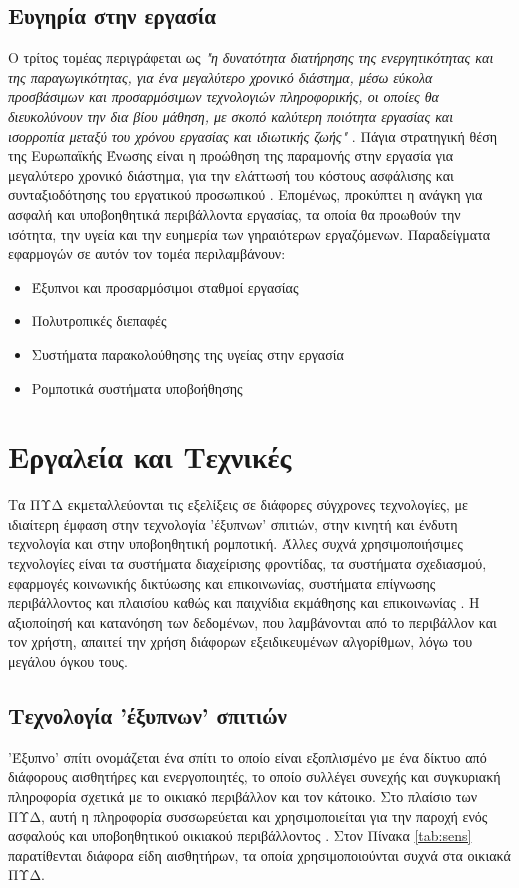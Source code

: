 \subsection{Ευγηρία στην εργασία}
Ο τρίτος τομέας περιγράφεται ως \textit{"η δυνατότητα διατήρησης της ενεργητικότητας και της παραγωγικότητας, για ένα μεγαλύτερο χρονικό διάστημα, μέσω εύκολα προσβάσιμων και προσαρμόσιμων τεχνολογιών πληροφορικής, οι οποίες θα διευκολύνουν την δια βίου μάθηση, με σκοπό καλύτερη ποιότητα εργασίας και ισορροπία μεταξύ του χρόνου εργασίας και ιδιωτικής ζωής"} \cite{broek}.
Πάγια στρατηγική θέση της Ευρωπαϊκής Ένωσης είναι η προώθηση της παραμονής στην εργασία για μεγαλύτερο χρονικό διάστημα, για την ελάττωσή του κόστους ασφάλισης και συνταξιοδότησης του εργατικού προσωπικού \cite{morschhauser2006healthy}\cite{dubois2019extending}.
Επομένως, προκύπτει η ανάγκη για ασφαλή και υποβοηθητικά περιβάλλοντα εργασίας, τα οποία θα προωθούν την ισότητα, την υγεία και την ευημερία των γηραιότερων εργαζόμενων.
Παραδείγματα εφαρμογών σε αυτόν τον τομέα περιλαμβάνουν:
\begin{itemize}
    \item Έξυπνοι και προσαρμόσιμοι σταθμοί εργασίας
    \item Πολυτροπικές διεπαφές
    \item Συστήματα παρακολούθησης της υγείας στην εργασία
    \item Ρομποτικά συστήματα υποβοήθησης
\end{itemize}{}
\section{Εργαλεία και Τεχνικές}
Τα ΠΥΔ εκμεταλλεύονται τις εξελίξεις σε διάφορες σύγχρονες τεχνολογίες, με ιδιαίτερη έμφαση στην τεχνολογία 'έξυπνων' σπιτιών, στην κινητή και ένδυτη τεχνολογία και στην υποβοηθητική ρομποτική. Άλλες συχνά χρησιμοποιήσιμες τεχνολογίες είναι τα συστήματα διαχείρισης φροντίδας, τα συστήματα σχεδιασμού, εφαρμογές κοινωνικής δικτύωσης και επικοινωνίας, συστήματα επίγνωσης περιβάλλοντος και πλαισίου καθώς και παιχνίδια εκμάθησης και επικοινωνίας \cite{rashidi2012survey}.
Η αξιοποίησή και κατανόηση των δεδομένων, που λαμβάνονται από το περιβάλλον και τον χρήστη, απαιτεί την χρήση διάφορων εξειδικευμένων αλγορίθμων, λόγω του μεγάλου όγκου τους.
\subsection{Τεχνολογία 'έξυπνων' σπιτιών}
'Έξυπνο' σπίτι ονομάζεται ένα σπίτι το οποίο είναι εξοπλισμένο με ένα δίκτυο από διάφορους αισθητήρες και ενεργοποιητές, το οποίο συλλέγει συνεχής και συγκυριακή πληροφορία σχετικά με το οικιακό περιβάλλον και τον κάτοικο.
Στο πλαίσιο των ΠΥΔ, αυτή η πληροφορία συσσωρεύεται και χρησιμοποιείται για την παροχή ενός ασφαλούς και υποβοηθητικού οικιακού περιβάλλοντος \cite{rashidi2012survey}\cite{Liu2016}\cite{Demiris2008}.
Στον Πίνακα \ref{tab:sens} παρατίθενται διάφορα είδη αισθητήρων, τα οποία χρησιμοποιούνται συχνά στα οικιακά ΠΥΔ.

